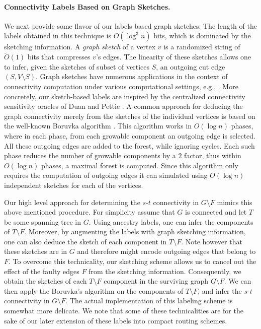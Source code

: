 \paragraph{Connectivity Labels Based on Graph Sketches.} We next provide some flavor of our labels based graph sketches. The length of the labels obtained in this technique is $O(\log^3{n})$ bits, which is dominated by the sketching information. A \emph{graph sketch} of a vertex $v$ is a randomized string of $\widetilde{O}(1)$ bits that compresses $v$'s edges. The linearity of these sketches allows one to infer, given the sketches of subset of vertices $S$, an outgoing cut edge $(S, V \setminus S)$. Graph sketches have numerous applications in the context of connectivity computation under various computational settings, e.g., \cite{kapron2013dynamic,kapralov2014spanners,GibbKKT15,DBLP:conf/podc/KingKT15,DBLP:conf/wdag/MashreghiK18,GhaffariP16,DuanConnectivitySODA17}. More concretely, our sketch-based labels are inspired by the centralized connectivity sensitivity oracles of Duan and Pettie \cite{DuanConnectivitySODA17}.   A common approach for deducing the graph connectivity merely from the sketches of the individual vertices is based on the well-known Boruvka algorithm \cite{Boruvka}. This algorithm works in $O(\log n)$ phases, where in each phase, from each growable component an outgoing edge is selected. All these outgoing
edges are added to the forest, while ignoring cycles. Each such phase reduces the number of
growable components by a $2$ factor, thus within $O(\log n)$ phases, a maximal forest is computed. Since this algorithm only requires the computation of outgoing edges it can simulated using $O(\log n)$ independent sketches for each of the vertices. 

Our high level approach for determining the $s$-$t$ connectivity in $G \setminus F$ mimics this above mentioned procedure. For simplicity assume that $G$ is connected and let $T$ be some spanning tree in $G$. Using ancestry labels, one can infer the components of $T \setminus F$. Moreover, by augmenting the labels with graph sketching information, one can also deduce the sketch of each component in $T \setminus F$. 
Note however that these sketches are in $G$ and therefore might encode outgoing edges that belong to $F$. To overcome this technicality, our sketching scheme allows us to cancel out the effect of the faulty edges $F$ from the sketching information. Consequently, we obtain the sketches of each $T \setminus F$ component in the surviving graph $G \setminus F$. We can then apply the Boruvka's algorithm on the components of $T \setminus F$, and infer the $s$-$t$ connectivity in $G \setminus F$. The actual implementation of this labeling scheme is somewhat more delicate. We note that some of these technicalities are for the sake of our later extension of these labels into compact routing schemes.


